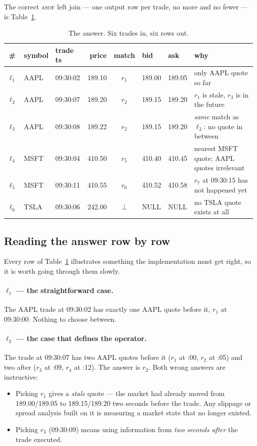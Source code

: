\documentclass[11pt,a4paper]{report}
\theoremstyle{definition}
\theoremstyle{plain}
\newcommand{\asof}{{\normalfont\scshape asof}}
\begin{document}
The correct \asof{} left join --- one output row per trade, no more and no fewer --- is
Table~\ref{tab:workedout}.

\begin{table}[h]
\centering
\small
\begin{tabular}{@{}cllrcll p{5.1cm}@{}}
\toprule
\# & symbol & trade ts & price & match & bid & ask & \textbf{why}\\
\midrule
$\ell_1$ & AAPL & 09:30:02 & 189.10 & $r_1$ & 189.00 & 189.05 & only AAPL quote so far\\
$\ell_2$ & AAPL & 09:30:07 & 189.20 & $r_2$ & 189.15 & 189.20 & $r_1$ is stale, $r_3$ is in the future\\
$\ell_3$ & AAPL & 09:30:08 & 189.22 & $r_2$ & 189.15 & 189.20 & \emph{same} match as $\ell_2$: no quote in between\\
$\ell_4$ & MSFT & 09:30:04 & 410.50 & $r_5$ & 410.40 & 410.45 & nearest MSFT quote; AAPL quotes irrelevant\\
$\ell_5$ & MSFT & 09:30:11 & 410.55 & $r_6$ & 410.52 & 410.58 & $r_7$ at 09:30:15 has not happened yet\\
$\ell_6$ & TSLA & 09:30:06 & 242.00 & $\bot$ & NULL & NULL & no TSLA quote exists at all\\
\bottomrule
\end{tabular}
\caption{The answer. Six trades in, six rows out.}
\label{tab:workedout}
\end{table}

\subsection{Reading the answer row by row}

Every row of Table~\ref{tab:workedout} illustrates something the implementation must get
right, so it is worth going through them slowly.

\paragraph{$\ell_1$ --- the straightforward case.} The AAPL trade at 09:30:02 has exactly
one AAPL quote before it, $r_1$ at 09:30:00. Nothing to choose between.

\paragraph{$\ell_2$ --- the case that defines the operator.} The trade at 09:30:07 has two
AAPL quotes before it ($r_1$ at :00, $r_2$ at :05) and two after ($r_3$ at :09, $r_4$ at
:12). The answer is $r_2$. Both wrong answers are instructive:
\begin{itemize}[nosep]
\item Picking $r_1$ gives a \emph{stale} quote --- the market had already moved from
      189.00/189.05 to 189.15/189.20 two seconds before the trade. Any slippage or spread
      analysis built on it is measuring a market state that no longer existed.
\item Picking $r_3$ (09:30:09) means using information from \emph{two seconds after} the
      trade executed.
\end{itemize}
\end{document}
